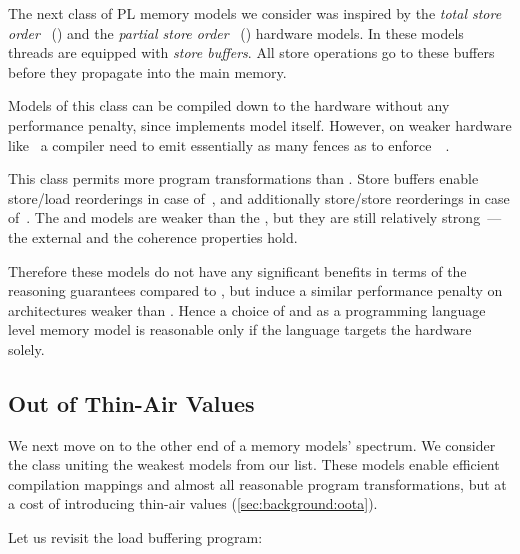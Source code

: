 The next class of PL memory models we consider 
was inspired by the \emph{total store order}~\cite{Sewell-al:CACM10} (\TSO) 
and the \emph{partial store order}~\cite{Sparc:94} (\PSO) hardware models. 
In these models threads are equipped with \emph{store buffers}.
All store operations go to these buffers before they 
propagate into the main memory.

Models of this class can be compiled down to the \Intel hardware without any 
performance penalty, since \Intel implements \TSO model itself.
However, on weaker hardware like~\POWER 
a compiler need to emit essentially as many fences 
as to enforce~\SC~\cite{Lustig-al:AISCA15}. 

This class permits more program transformations than \SC.
Store buffers enable store/load reorderings in case of~\TSO,
and additionally store/store reorderings in case of~\PSO.
The \TSO and \PSO models are weaker than the \SC, 
but they are still relatively strong~---
the external \DRF and the coherence properties hold.

Therefore these models do not have any significant 
benefits in terms of the reasoning guarantees compared to \SC,
but induce a similar performance penalty 
on architectures weaker than \Intel. 
Hence a choice of \TSO and \PSO as a programming language level
memory model is reasonable only if the language targets
the \Intel hardware solely. 

\subsection{Out of Thin-Air Values}
\label{sec:analysis:oota}

We next move on to the other end of a memory models' spectrum. 
We consider the class uniting the weakest models from our list.
These models enable efficient compilation mappings and 
almost all reasonable program transformations, but at a cost of 
introducing thin-air values (\cref{sec:background:oota}).

Let us revisit the load buffering program:  

